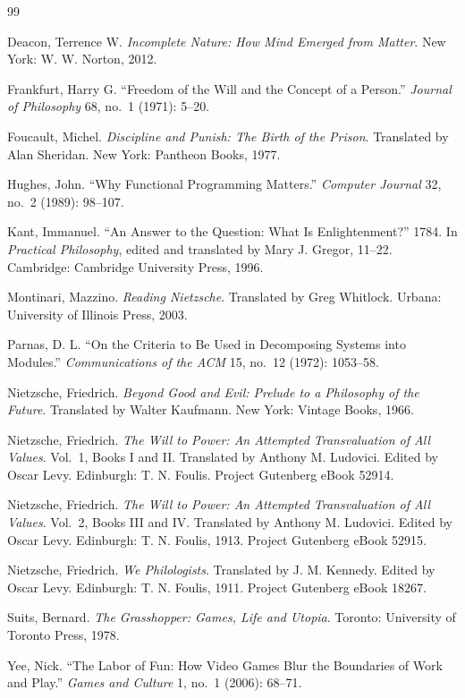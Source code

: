 \documentclass[11pt]{article}
\begin{document}
\newpage
\begin{thebibliography}{99}

Deacon, Terrence W. \emph{Incomplete Nature: How Mind Emerged from Matter}. New York: W. W. Norton, 2012.

Frankfurt, Harry G. ``Freedom of the Will and the Concept of a Person.'' \emph{Journal of Philosophy} 68, no.\ 1 (1971): 5--20.

Foucault, Michel. \emph{Discipline and Punish: The Birth of the Prison}. Translated by Alan Sheridan. New York: Pantheon Books, 1977.

Hughes, John. ``Why Functional Programming Matters.'' \emph{Computer Journal} 32, no.\ 2 (1989): 98--107.

Kant, Immanuel. ``An Answer to the Question: What Is Enlightenment?'' 1784. In \emph{Practical Philosophy}, edited and translated by Mary J. Gregor, 11--22. Cambridge: Cambridge University Press, 1996.

Montinari, Mazzino. \emph{Reading Nietzsche}. Translated by Greg Whitlock. Urbana: University of Illinois Press, 2003.

Parnas, D. L. ``On the Criteria to Be Used in Decomposing Systems into Modules.'' \emph{Communications of the ACM} 15, no.\ 12 (1972): 1053--58.

Nietzsche, Friedrich. \emph{Beyond Good and Evil: Prelude to a Philosophy of the Future}. Translated by Walter Kaufmann. New York: Vintage Books, 1966.

Nietzsche, Friedrich. \emph{The Will to Power: An Attempted Transvaluation of All Values}. Vol.\ 1, Books I and II. Translated by Anthony M. Ludovici. Edited by Oscar Levy. Edinburgh: T. N. Foulis. Project Gutenberg eBook 52914.

Nietzsche, Friedrich. \emph{The Will to Power: An Attempted Transvaluation of All Values}. Vol.\ 2, Books III and IV. Translated by Anthony M. Ludovici. Edited by Oscar Levy. Edinburgh: T. N. Foulis, 1913. Project Gutenberg eBook 52915.

Nietzsche, Friedrich. \emph{We Philologists}. Translated by J. M. Kennedy. Edited by Oscar Levy. Edinburgh: T. N. Foulis, 1911. Project Gutenberg eBook 18267.

Suits, Bernard. \emph{The Grasshopper: Games, Life and Utopia}. Toronto: University of Toronto Press, 1978.

Yee, Nick. ``The Labor of Fun: How Video Games Blur the Boundaries of Work and Play.'' \emph{Games and Culture} 1, no.\ 1 (2006): 68--71.

\end{thebibliography}
\end{document}
